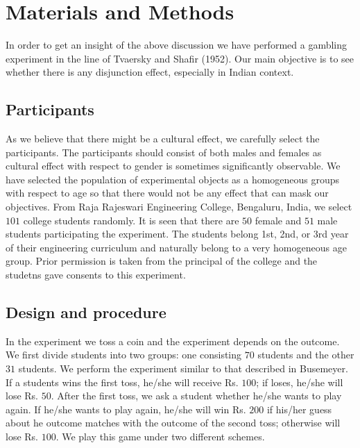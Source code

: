 \documentclass[review]{elsarticle}
\begin{document}
\section{Materials and Methods}
 In order to get an insight of the above discussion we have performed a gambling experiment in the line of Tvaersky and Shafir (1952). Our main objective is to see whether there is any disjunction effect, especially in Indian context.

\subsection{Participants}
As we believe that there might be a cultural effect, we carefully select the participants. The participants should consist of both males and females as cultural effect with respect to gender is sometimes significantly observable. We have selected the population of experimental objects as a homogeneous groups with respect to age so that there would not be any effect that can mask our objectives. From Raja Rajeswari Engineering College, Bengaluru, India, we select $101$ college students randomly. It is seen that there are $50$ female and $51$ male students participating the experiment. The students belong 1st, 2nd, or 3rd year of their engineering curriculum and naturally belong to a very homogeneous age group. Prior permission is taken from the principal of the college and the studetns gave consents to this experiment. 


\subsection{Design and procedure}
In the experiment we toss a coin and the experiment depends on the outcome. We first divide students into two groups: one consisting $70$ students and the other $31$ students. We perform the experiment similar to that described in Busemeyer. If a students wins the first toss, he/she will receive Rs. $100$; if loses, he/she will lose Rs. $50$. After the first toss, we ask a student whether he/she wants to play again. If he/she wants to play again, he/she will win Rs. $200$ if his/her guess about he outcome matches with the outcome of the second toss; otherwise will lose Rs. $100$. We play this game under two different schemes.
\end{document}
